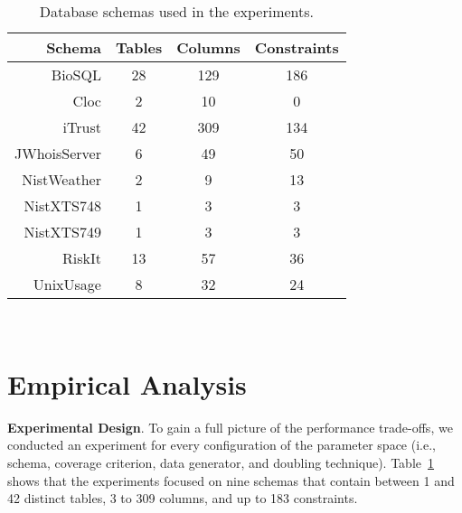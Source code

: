 
\begin{table}[t]
  \centering
  
  {\small
  \begin{tabular}{r | c c c}
                           Schema & Tables & Columns & Constraints \\ \hline
    BioSQL                        & 28     & 129     & 186 \\
    Cloc                          & 2      & 10      & 0 \\
    iTrust                        & 42     & 309     & 134 \\
    JWhoisServer                  & 6      & 49      & 50 \\
    NistWeather                   & 2      & 9       & 13 \\
    NistXTS748                    & 1      & 3       & 3 \\
    NistXTS749                    & 1      & 3       & 3 \\
    RiskIt                        & 13     & 57      & 36 \\
    UnixUsage                     & 8      & 32      & 24
\end{tabular}}

  \vspace*{-.05in}
  \caption{Database schemas used in the experiments.}~\label{tab:schemas}
  \vspace*{-.25in}

\end{table}

\vspace{-.05in}
\section{Empirical Analysis}
\vspace{-.05in}

\textbf{Experimental Design}. To gain a full picture of the performance trade-offs, we conducted an experiment for every
configuration of the parameter space (i.e., schema, coverage criterion, data generator, and doubling technique).
Table~\ref{tab:schemas} shows that the experiments focused on nine schemas that contain between 1 and 42 distinct
tables, 3 to 309 columns, and up to 183 constraints.

